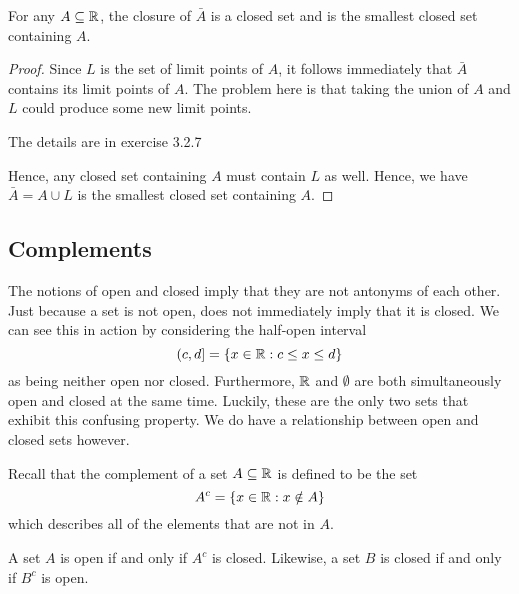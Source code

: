 \begin{theorem}{}{}
    For any \( A \subseteq \mathbb{R}  \), the closure of \( \bar{A} \) is a closed set and is the smallest closed set containing \( A \). 
\end{theorem}

\begin{proof}
    Since \( L \) is the set of limit points of \( A \), it follows immediately that \( \bar{A} \)
    contains its limit points of \( A \). The problem here is that taking the union of \( A \) and \( L \) could produce some new limit points. 
    \begin{center}
        The details are in exercise 3.2.7
    \end{center}
    Hence, any closed set containing \( A \) must contain \( L \) as well. Hence, we have 
    \( \bar{A} = A \cup L  \) is the smallest closed set containing \( A \). 
\end{proof}

\subsection{Complements}

The notions of open and closed imply that they are not antonyms of each other. Just because a set is not open, does not immediately imply that it is closed. We can see this in action by considering the half-open interval 
\[ (c,d] = \{ x \in \mathbb{R} : c \leq x \leq d \}  \]
as being neither open nor closed. Furthermore, \( \mathbb{R} \) and \( \emptyset \) are both simultaneously open and closed at the same time. Luckily, these are the only two sets that exhibit this confusing property. We do have a relationship between open and closed sets however.   

Recall that the complement of a set \( A \subseteq \mathbb{R}  \) is defined to be the set
\[ A^c = \{ x \in \mathbb{R} : x \notin A  \} \]
which describes all of the elements that are not in \( A \). 

\begin{theorem}{}{}
A set \( A \) is open if and only if \( A^c \) is closed. Likewise, a set \( B \) is closed if and only if \( B^c \) is open. 
\end{theorem}

